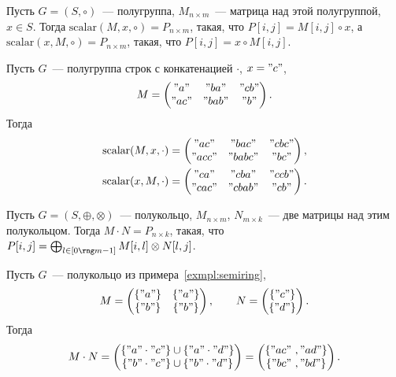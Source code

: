 \begin{definition}
    Пусть $G = (S, \circ)$~--- полугруппа, $M_{n \times m}$~--- матрица над этой полугруппой, $x \in S$.
    Тогда $\mathrm{scalar}(M, x,\circ) = P_{n \times m}$, такая, что $P[i, j] = M[i, j] \circ x$, а $\mathrm{scalar}(x, M, \circ) = P_{n \times m}$, такая, что $P[i, j] = x \circ M[i, j]$.
\end{definition}

\begin{example}
    Пусть $G$~--- полугруппа строк с конкатенацией $\cdot$, $x = "c"$,
    \[
        M =
        \begin{pmatrix}
            "a"  & "ba"  & "cb" \\
            "ac" & "bab" & "b"
        \end{pmatrix}.
    \]
    Тогда
    \begin{gather*}
        \mathrm{scalar}(M,x, \cdot) =
        \begin{pmatrix}
            "ac"  & "bac"  & "cbc" \\
            "acc" & "babc" & "bc"
        \end{pmatrix},\\
        \mathrm{scalar}(x, M, \cdot) =
        \begin{pmatrix}
            "ca"  & "cba"  & "ccb" \\
            "cac" & "cbab" & "cb"
        \end{pmatrix}.
    \end{gather*}
\end{example}

\begin{definition}
    \label{def:MxM}
    Пусть $G = (S, \oplus, \otimes)$~--- полукольцо, $M_{n \times m}$, $N_{m\times k}$~--- две матрицы над этим полукольцом.
    Тогда $M \cdot N = P_{n \times k}$, такая, что $P[i, j] = \bigoplus_{l \in [0 \rng m - 1]} M[i, l] \otimes N[l, j]$.
\end{definition}

\begin{example}
    Пусть $G$~--- полукольцо из примера~\ref{exmpl:semiring},
    \[
        M =
        \begin{pmatrix}
            \{"a"\} & \{"a"\} \\
            \{"b"\} & \{"b"\}
        \end{pmatrix},
        \qquad
        N =
        \begin{pmatrix}
            \{"c"\} \\
            \{"d"\}
        \end{pmatrix}.
    \]
    Тогда
    \[
        M \cdot N =
        \begin{pmatrix}
            \{"a" \cdot "c"\} \cup \{"a" \cdot "d"\} \\
            \{"b" \cdot "c"\} \cup \{"b" \cdot "d"\}
        \end{pmatrix}=
        \begin{pmatrix}
            \{"ac" \ ,  "ad"\} \\
            \{"bc" \ , "bd"\}
        \end{pmatrix}.
    \]
\end{example}

